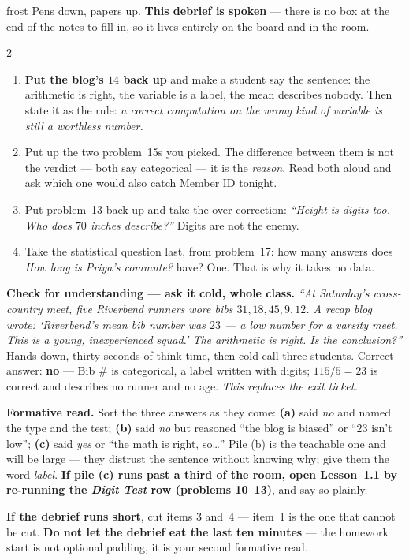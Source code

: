 \documentclass[10pt]{article}
\begin{document}
\boxguard[24]
\begin{skillbox}{frost}
Pens down, papers up. \textbf{This debrief is spoken} --- there is no box at the end of the
notes to fill in, so it lives entirely on the board and in the room.
\begin{multicols}{2}
\begin{enumerate}[leftmargin=1.3em, nosep, itemsep=3pt]
  \item \textbf{Put the blog's $14$ back up} and make a student say the sentence: the
        arithmetic is right, the variable is a label, the mean describes nobody. Then state it
        as the rule: \emph{a correct computation on the wrong kind of variable is still a
        worthless number.}
  \item Put up the two problem~15s you picked. The difference between them is not the
        verdict --- both say categorical --- it is the \emph{reason}. Read both aloud and ask
        which one would also catch Member ID tonight.
  \item Put problem~13 back up and take the over-correction: \emph{``Height is digits too.
        Who does $70$ inches describe?''} Digits are not the enemy.
  \item Take the statistical question last, from problem~17: how many answers does
        \emph{How long is Priya's commute?} have? One. That is why it takes no data.
\end{enumerate}
\columnbreak
\textbf{Check for understanding --- ask it cold, whole class.} \emph{``At Saturday's
cross-country meet, five Riverbend runners wore bibs $31, 18, 45, 9, 12$. A recap blog wrote:
`Riverbend's mean bib number was $23$ --- a low number for a varsity meet. This is a young,
inexperienced squad.' The arithmetic is right. Is the conclusion?''} Hands down, thirty
seconds of think time, then cold-call three students. Correct answer: \textbf{no} --- Bib \#
is categorical, a label written with digits; $115/5 = 23$ is correct and describes no runner
and no age. \emph{This replaces the exit ticket.}

\textbf{Formative read.} Sort the three answers as they come: \textbf{(a)} said \emph{no} and
named the type and the test; \textbf{(b)} said \emph{no} but reasoned ``the blog is biased''
or ``$23$ isn't low''; \textbf{(c)} said \emph{yes} or ``the math is right, so\ldots'' Pile
(b) is the teachable one and will be large --- they distrust the sentence without knowing
why; give them the word \emph{label}. \textbf{If pile (c) runs past a third of the room, open
Lesson~1.1 by re-running the \emph{Digit Test} row (problems 10--13)}, and say so plainly.

\textbf{If the debrief runs short}, cut items 3 and~4 --- item~1 is the one that cannot be
cut. \textbf{Do not let the debrief eat the last ten minutes} --- the homework start is not
optional padding, it is your second formative read.
\end{multicols}
\end{skillbox}
\end{document}
